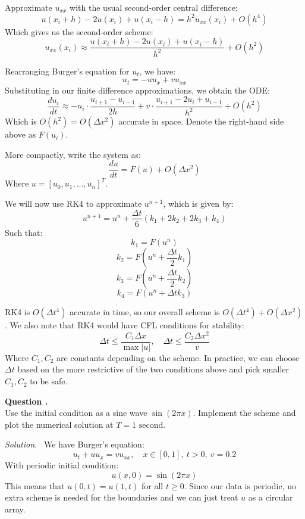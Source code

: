 \documentclass[12pt]{article}
\newcounter{question}
\newcounter{subquest}
\newcommand{\subquestion}[1][true]{
    \stepcounter{subquest} 
    \ifthenelse{\equal{#1}{true} \and \value{subquest}>1}{\newpage}{}
    \vspace{1em}
    \textbf{\large Question \thequestion.\thesubquest}
    \vspace{.5em}\ \\}
\newcommand{\solution}
    {\par\vspace{0.5em}\noindent\emph{Solution.}\ }
    {\par\vspace{1em}}
\begin{document}
Approximate $u_{xx}$ with the usual second-order central difference:
\[u(x_i+h) - 2u(x_i) + u(x_i - h) = h^2u_{xx}(x_i) + O(h^4)\]
Which gives us the second-order scheme:
\[u_{xx}(x_i) \approx \frac{u(x_i+h) - 2u(x_i) + u(x_i - h)}{h^2} + O(h^2)\]

Rearranging Burger's equation for $u_t$, we have:
\[u_t = -uu_x + vu_{xx}\]
Substituting in our finite difference approximations, we obtain the ODE:
\[\frac{d u_i}{dt} \approx -u_i \cdot \frac{u_{i+1}- u_{i-1}}{2h} + v \cdot \frac{u_{i+1} - 2u_i + u_{i-1}}{h^2}+O(h^2)\]
Which is $O(h^2)=O(\Delta x^2)$ accurate in space. Denote the right-hand side above as $F(u_i)$. 

More compactly, write the system as:
\[\frac{d u}{dt} = F(u) + O(\Delta x^2)\]
Where $u = [u_0, u_1, ..., u_n]^T$.

We will now use RK4 to approximate $u^{n+1}$, which is given by:
\[u^{n+1} = u^n + \frac{\Delta t}{6}(k_1 + 2k_2 + 2k_3 + k_4)\]
Such that:
\[k_1 = F(u^n)\]
\[k_2 = F\left(u^n + \frac{\Delta t}{2}k_1\right)\]
\[k_3 = F\left(u^n + \frac{\Delta t}{2}k_2\right)\]
\[k_4 = F\left(u^n + \Delta t k_3\right)\]

RK4 is $O(\Delta t^4)$ accurate in time, so our overall scheme is $O(\Delta t^4)+O(\Delta x^2)$.
We also note that RK4 would have CFL conditions for stability:
\[\Delta t \leq \frac{C_1 \Delta x}{\max |u|}, \quad \Delta t \leq \frac{C_2 \Delta x^2}{v}\] 
Where $C_1, C_2$ are constants depending on the scheme.
In practice, we can choose $\Delta t$ based on the more restrictive of the two conditions above and pick smaller $C_1, C_2$ to be safe.

\subquestion
Use the initial condition as a sine wave $\sin(2\pi x)$. 
Implement the scheme and plot the numerical solution 
at $T=1 \text{ second}$.

\solution
We have Burger's equation:
\[u_t+uu_x=vu_{xx},\quad x\in[0,1], \ t>0, \ v=0.2\]
With periodic initial condition:
\[u(x,0) = \sin(2\pi x)\]
This means that $u(0,t) = u(1,t)$ for all $t \geq 0$. Since our data is periodic, no extra scheme is needed for the boundaries and we can just treat $u$ as a circular array.
\end{document}
